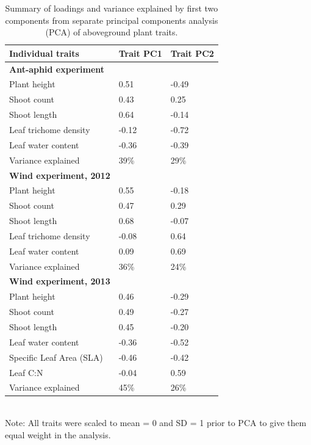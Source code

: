 \documentclass[11pt]{article}
\begin{document}
\begin{table}[] %
\centering
\caption{Summary of loadings and variance explained by first
two components from separate principal components analysis (PCA) of
aboveground plant traits.}
\label{TableS3}
\begin{tabular}{@{}lll@{}}
\toprule
Individual traits & Trait PC1 & Trait
PC2\tabularnewline
\midrule
\textbf{Ant-aphid experiment} & &\tabularnewline
Plant height & 0.51 & -0.49\tabularnewline
Shoot count & 0.43 & 0.25\tabularnewline
Shoot length & 0.64 & -0.14\tabularnewline
Leaf trichome density & -0.12 & -0.72\tabularnewline
Leaf water content & -0.36 & -0.39\tabularnewline
Variance explained & 39\% & 29\% \\ %
\hline
\textbf{Wind experiment, 2012} & &\tabularnewline
Plant height & 0.55 & -0.18\tabularnewline
Shoot count & 0.47 & 0.29\tabularnewline
Shoot length & 0.68 & -0.07\tabularnewline
Leaf trichome density & -0.08 & 0.64\tabularnewline
Leaf water content & 0.09 & 0.69\tabularnewline
Variance explained & 36\% & 24\% \\ %
\hline
\textbf{Wind experiment, 2013} & &\tabularnewline
Plant height & 0.46 & -0.29\tabularnewline
Shoot count & 0.49 & -0.27\tabularnewline
Shoot length & 0.45 & -0.20\tabularnewline
Leaf water content & -0.36 & -0.52\tabularnewline
Specific Leaf Area (SLA) & -0.46 & -0.42\tabularnewline
Leaf C:N & -0.04 & 0.59\tabularnewline
Variance explained & 45\% & 26\%\tabularnewline
\bottomrule
\end{tabular}
\bigskip{}
\\
{\footnotesize Note: All traits were scaled to mean = 0 and SD = 1
prior to PCA to give them equal weight in the analysis.}
\end{table}
\end{document}
